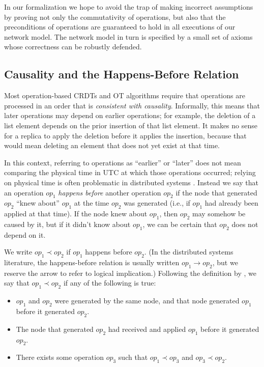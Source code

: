 In our formalization we hope to avoid the trap of making incorrect assumptions by proving not only
the commutativity of operations, but also that the preconditions of operations are guaranteed to
hold in all executions of our network model. The network model in turn is specified by a small set
of axioms whose correctness can be robustly defended.

\subsection{Causality and the Happens-Before Relation}\label{sect.causality}

Most operation-based CRDTs and OT algorithms require that operations are processed in an order that
is \emph{consistent with causality}. Informally, this means that later operations may depend on
earlier operations; for example, the deletion of a list element depends on the prior insertion of
that list element. It makes no sense for a replica to apply the deletion before it applies the
insertion, because that would mean deleting an element that does not yet exist at that time.

In this context, referring to operations as ``earlier'' or ``later'' does not mean comparing the
physical time in UTC at which those operations occurred; relying on physical time is often
problematic in distributed systems \cite{Sheehy:2015jm}. Instead we say that an operation
$\mathit{op}_1$ \emph{happens before} another operation $\mathit{op}_2$ if the node that generated
$\mathit{op}_2$ ``knew about'' $\mathit{op}_1$ at the time $\mathit{op}_2$ was generated (i.e., if
$\mathit{op}_1$ had already been applied at that time). If the node knew about $\mathit{op}_1$, then
$\mathit{op}_2$ may somehow be caused by it, but if it didn't know about $\mathit{op}_1$, we can be
certain that $\mathit{op}_2$ does not depend on it.

We write $\mathit{op}_1 \prec \mathit{op}_2$ if $\mathit{op}_1$ happens before $\mathit{op}_2$. (In
the distributed systems literature, the happens-before relation is usually written
$\mathit{op}_1 \longrightarrow \mathit{op}_2$, but we reserve the arrow to refer to logical
implication.) Following the definition by \citet{Lamport:1978jq}, we say that
$\mathit{op}_1 \prec \mathit{op}_2$ if any of the following is true:

\begin{itemize}
\item $\mathit{op}_1$ and $\mathit{op}_2$ were generated by the same node, and that node generated
    $\mathit{op}_1$ before it generated $\mathit{op}_2$.
\item The node that generated $\mathit{op}_2$ had received and applied $\mathit{op}_1$ before it
    generated $\mathit{op}_2$.
\item There exists some operation $\mathit{op}_3$ such that
    $\mathit{op}_1 \prec \mathit{op}_3$ and $\mathit{op}_3 \prec \mathit{op}_2$.
\end{itemize}

